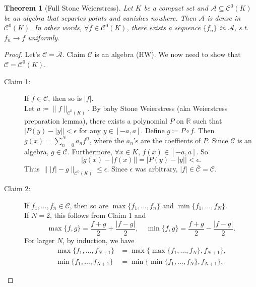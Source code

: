 \documentclass[12pt]{article}
\theoremstyle{plain}
\newtheorem{thm}{Theorem}
\theoremstyle{definition}
\begin{document}
\begin{thm}[Full Stone Weierstress]
    Let $K$ be a compact set and $\mathcal{A}\subseteq\mathcal{C}^0(K)$ be an
    algebra that separtes points and vanishes nowhere.
    Then $\mathcal{A}$ is dense in $\mathcal{C}^0(K)$.
    In other words, $\forall f\in\mathcal{C}^0(K)$, there exists a sequence
    $\{f_n\}$ in $\mathcal{A}$, s.t. $f_n\rightarrow f$ uniformly.
\end{thm}
\begin{proof}
    Let's $\mathcal{C}=\bar{\mathcal{A}}$.
    Claim $\mathcal{C}$ is an algebra (HW).
    We now need to show that $\mathcal{C}=\mathcal{C}^0(K)$.
    \begin{description}
        \item[Claim 1:] If $f\in\mathcal{C}$, then so is $|f|$.\\
        Let $a\coloneqq\|f\|_{\mathcal{C}^0(K)}$.
        By baby Stone Weierstress (aka Weierstress preparation lemma), there
        exists a polynomial $P$ on $\mathbb{R}$ such that
        $|P(y)-|y||<\epsilon$ for any $y\in[-a,a]$.
        Define $g\coloneqq P\circ f$.
        Then $g(x)=\sum_{n=0}^N a_nf^n$, where the $a_n$'s are the coeffients of
        $P$.
        Since $\mathcal{C}$ is an algebra, $g\in\mathcal{C}$.
        Furthermore, $\forall x\in K$, $f(x)\in[-a,a]$.
        So
        $$|g(x)-|f(x)||=|P(y)-|y||<\epsilon.$$
        Thus $\||f|-g\|_{\mathcal{C}^0(K)}\leq\epsilon$.
        Since $\epsilon$ was arbitrary, $|f|\in\bar{\mathcal{C}}=\mathcal{C}$.

        \item[Claim 2:] If $f_1,\ldots,f_n\in\mathcal{C}$, then so are
        $\max\{f_1,\ldots,f_n\}$ and $\min\{f_1,\ldots,f_N\}$.\\
        If $N=2$, this follows from Claim 1 and
        $$\max\{f,g\}=\frac{f+g}{2}+\frac{|f-g|}{2},\quad
        \min\{f,g\}=\frac{f+g}{2}-\frac{|f-g|}{2}.$$
        For larger $N$, by induction, we have
        $$\begin{aligned}
            \max\{f_1,\ldots,f_{N+1}\}&=\max\{\max\{f_1,\ldots,f_N\},f_{N+1}\},\\
            \min\{f_1,\ldots,f_{N+1}\}&=\min\{\min\{f_1,\ldots,f_N\},f_{N+1}\}.
        \end{aligned}$$


\end{description}
\end{proof}
\end{document}
